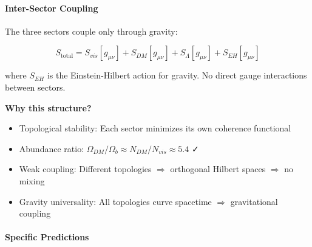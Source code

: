\documentclass[12pt,a4paper]{article}
\begin{document}
\paragraph{Inter-Sector Coupling}

The three sectors couple only through gravity:

\begin{equation}
S_{\mathrm{total}} = S_{vis}[g_{\mu\nu}] + S_{DM}[g_{\mu\nu}] + S_\Lambda[g_{\mu\nu}] + S_{EH}[g_{\mu\nu}]
\end{equation}

where $S_{EH}$ is the Einstein-Hilbert action for gravity. No direct gauge interactions between sectors.

\textbf{Why this structure?}
\begin{itemize}
\item Topological stability: Each sector minimizes its own coherence functional
\item Abundance ratio: $\Omega_{DM}/\Omega_b \approx N_{DM}/N_{vis} \approx 5.4$ ✓
\item Weak coupling: Different topologies $\Rightarrow$ orthogonal Hilbert spaces $\Rightarrow$ no mixing
\item Gravity universality: All topologies curve spacetime $\Rightarrow$ gravitational coupling
\end{itemize}

\paragraph{Specific Predictions}
\end{document}
